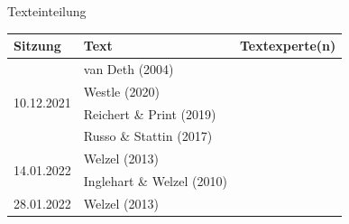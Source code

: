 \documentclass[11pt]{beamer}
\begin{document}
\begin{frame}[t]{Texteinteilung}
	\begin{center}	
		\begin{table}
			\begin{tabular}{l l l}
			\toprule[2pt]
			Sitzung & Text & Textexperte(n)\\
			\midrule
			\multirow{4}{*}{10.12.2021} & van Deth (2004) & \\
			\cmidrule{2-3}
			& Westle (2020) & \\
			\cmidrule{2-3}
			& Reichert \& Print (2019) & \\
			\cmidrule{2-3}
			& Russo \& Stattin (2017) & \\
			\midrule
			\multirow{2}{*}{14.01.2022} & Welzel (2013) & \\
			\cmidrule{2-3}
			& Inglehart \& Welzel (2010) \\
			\midrule
			28.01.2022 & Welzel (2013) & \\
			\bottomrule[2pt]
			
			\end{tabular}
		\end{table}
	\end{center}
\end{frame}
\end{document}
